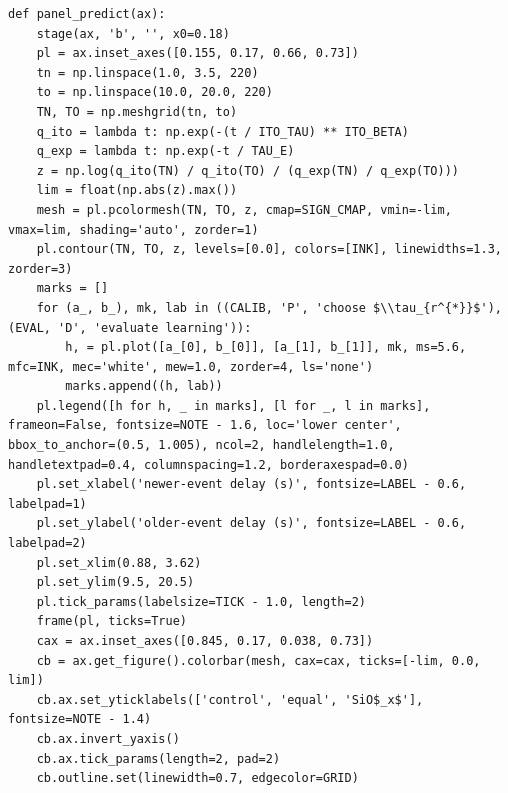 \documentclass[a4paper,10pt]{article}
\begin{document}
\begin{Verbatim}
def panel_predict(ax):
    stage(ax, 'b', '', x0=0.18)
    pl = ax.inset_axes([0.155, 0.17, 0.66, 0.73])
    tn = np.linspace(1.0, 3.5, 220)
    to = np.linspace(10.0, 20.0, 220)
    TN, TO = np.meshgrid(tn, to)
    q_ito = lambda t: np.exp(-(t / ITO_TAU) ** ITO_BETA)
    q_exp = lambda t: np.exp(-t / TAU_E)
    z = np.log(q_ito(TN) / q_ito(TO) / (q_exp(TN) / q_exp(TO)))
    lim = float(np.abs(z).max())
    mesh = pl.pcolormesh(TN, TO, z, cmap=SIGN_CMAP, vmin=-lim, vmax=lim, shading='auto', zorder=1)
    pl.contour(TN, TO, z, levels=[0.0], colors=[INK], linewidths=1.3, zorder=3)
    marks = []
    for (a_, b_), mk, lab in ((CALIB, 'P', 'choose $\\tau_{r^{*}}$'), (EVAL, 'D', 'evaluate learning')):
        h, = pl.plot([a_[0], b_[0]], [a_[1], b_[1]], mk, ms=5.6, mfc=INK, mec='white', mew=1.0, zorder=4, ls='none')
        marks.append((h, lab))
    pl.legend([h for h, _ in marks], [l for _, l in marks], frameon=False, fontsize=NOTE - 1.6, loc='lower center', bbox_to_anchor=(0.5, 1.005), ncol=2, handlelength=1.0, handletextpad=0.4, columnspacing=1.2, borderaxespad=0.0)
    pl.set_xlabel('newer-event delay (s)', fontsize=LABEL - 0.6, labelpad=1)
    pl.set_ylabel('older-event delay (s)', fontsize=LABEL - 0.6, labelpad=2)
    pl.set_xlim(0.88, 3.62)
    pl.set_ylim(9.5, 20.5)
    pl.tick_params(labelsize=TICK - 1.0, length=2)
    frame(pl, ticks=True)
    cax = ax.inset_axes([0.845, 0.17, 0.038, 0.73])
    cb = ax.get_figure().colorbar(mesh, cax=cax, ticks=[-lim, 0.0, lim])
    cb.ax.set_yticklabels(['control', 'equal', 'SiO$_x$'], fontsize=NOTE - 1.4)
    cb.ax.invert_yaxis()
    cb.ax.tick_params(length=2, pad=2)
    cb.outline.set(linewidth=0.7, edgecolor=GRID)


\end{Verbatim}
\end{document}
